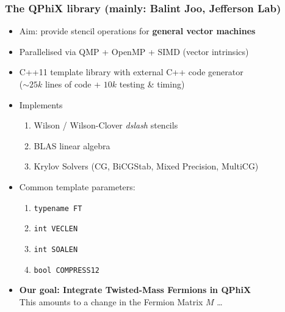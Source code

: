 \documentclass{beamer}
\begin{document}

  \begin{frame}
    \frametitle{The QPhiX library (mainly: Balint Joo, Jefferson Lab)}

    \begin{itemize}
      \item Aim: provide stencil operations for \textbf{general vector machines}
        \vfill
      \item Parallelised via QMP + OpenMP + SIMD (vector intrinsics)
        \vfill
      \item C++11 template library with external C++ code generator\\
        ($\sim25k$ lines of code + $10k$ testing \& timing)
        \vfill
      \item Implements
        \begin{enumerate}
          \item Wilson / Wilson-Clover \textit{dslash} stencils
          \item BLAS linear algebra
          \item Krylov Solvers (CG, BiCGStab, Mixed Precision, MultiCG)
        \end{enumerate}
        \vfill
      \item Common template parameters:
        \begin{enumerate}
          \item \texttt{typename FT}
          \item \texttt{int VECLEN}
          \item \texttt{int SOALEN}
          \item \texttt{bool COMPRESS12}
        \end{enumerate}
        \vfill
      \item \textbf{Our goal: Integrate Twisted-Mass Fermions in QPhiX}\\
        This amounts to a change in the Fermion Matrix $M$ \dots
    \end{itemize}

  \end{frame}

\end{document}
